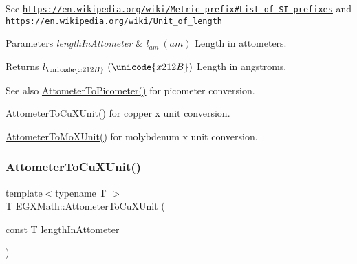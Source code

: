 See \href{https://en.wikipedia.org/wiki/Metric_prefix#List_of_SI_prefixes}{\tt https\+://en.\+wikipedia.\+org/wiki/\+Metric\+\_\+prefix\#\+List\+\_\+of\+\_\+\+S\+I\+\_\+prefixes} and \href{https://en.wikipedia.org/wiki/Unit_of_length}{\tt https\+://en.\+wikipedia.\+org/wiki/\+Unit\+\_\+of\+\_\+length} 
\begin{DoxyParams}{Parameters}
{\em length\+In\+Attometer} & $ l_{am}\ (am)$ Length in attometers. \\
\hline
\end{DoxyParams}
\begin{DoxyReturn}{Returns}
$ l_{\unicode{x212B}}\ (\unicode{x212B})$ Length in angstroms. 
\end{DoxyReturn}
\begin{DoxySeeAlso}{See also}
\mbox{\hyperlink{group___e_g_x_math-_conversions-_length_conversions-_attometer-_s_i_ga46ccf47b501bffeb16bc792377e55991}{Attometer\+To\+Picometer()}} for picometer conversion. 

\mbox{\hyperlink{group___e_g_x_math-_conversions-_length_conversions-_attometer-_non-_s_i_gabd388c2e0821ac9066b4fb87e35402b1}{Attometer\+To\+Cu\+X\+Unit()}} for copper x unit conversion. 

\mbox{\hyperlink{group___e_g_x_math-_conversions-_length_conversions-_attometer-_non-_s_i_ga79ec6f4ec4a97af05fe8f69b80805ab7}{Attometer\+To\+Mo\+X\+Unit()}} for molybdenum x unit conversion. 
\end{DoxySeeAlso}
\mbox{\label{group___e_g_x_math-_conversions-_length_conversions-_attometer-_non-_s_i_gabd388c2e0821ac9066b4fb87e35402b1}} 
\subsubsection{\texorpdfstring{Attometer\+To\+Cu\+X\+Unit()}{AttometerToCuXUnit()}}
{\footnotesize\ttfamily template$<$typename T $>$ \\
T E\+G\+X\+Math\+::\+Attometer\+To\+Cu\+X\+Unit (\begin{DoxyParamCaption}\item[{const T}]{length\+In\+Attometer }\end{DoxyParamCaption})}



